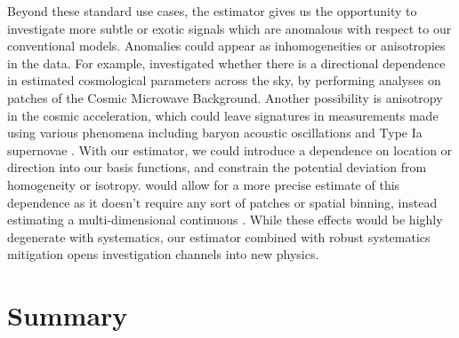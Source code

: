 Beyond these standard use cases, the estimator gives us the opportunity to investigate more subtle or exotic signals which are anomalous with respect to our conventional models.
Anomalies could appear as inhomogeneities or anisotropies in the data.
For example, \cite{MukherjeeWandelt2018} investigated whether there is a directional dependence in estimated cosmological parameters across the sky, by performing analyses on patches of the Cosmic Microwave Background.
Another possibility is anisotropy in the cosmic acceleration, which could leave signatures in measurements made using various phenomena including baryon acoustic oscillations \citep{Faltenbacher2012} and Type Ia supernovae \citep{Colin2019}.
With our estimator, we could introduce a dependence on location or direction into our basis functions, and constrain the potential deviation from homogeneity or isotropy.
\Est would allow for a more precise estimate of this dependence as it doesn't require any sort of patches or spatial binning, instead estimating a multi-dimensional continuous \cf.
While these effects would be highly degenerate with systematics, our estimator combined with robust systematics mitigation opens investigation channels into new physics.


\section{Summary}
\label{sec:summary}

